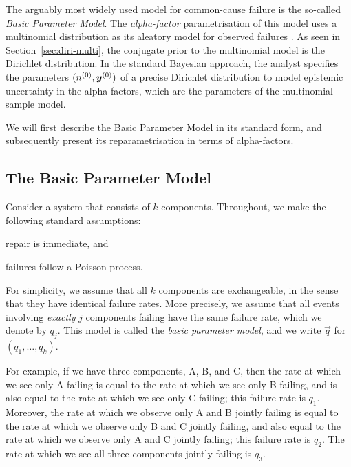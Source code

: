 The arguably most widely used model for common-cause failure is the so-called \emph{Basic Parameter Model}.
The \emph{alpha-factor} parametrisation of this model uses a multinomial distribution
as its aleatory model for observed failures \parencite{1988:mosleh::common:cause}. 
As seen in Section~\ref{sec:diri-multi}, the conjugate prior to the multinomial model is the Dirichlet distribution.
In the standard Bayesian approach, the analyst specifies the parameters $(n^{(0)}, {\bm y}^{(0)})$ of a precise Dirichlet distribution
to model epistemic uncertainty in the alpha-factors, which are the parameters of the multinomial sample model.

We will first describe the Basic Parameter Model in its standard form,
and subsequently present its reparametrisation in terms of alpha-factors.


\subsection{The Basic Parameter Model}
\label{sec:basic-param-model}

Consider a system that consists of $k$ components.
Throughout, we make the following standard assumptions:
\begin{inparaenum}[(i)]
\item repair is immediate, and
\item failures follow a Poisson process.
\end{inparaenum}

For simplicity, we assume that all $k$ components are exchangeable,
in the sense that they have identical failure rates.
More precisely,
we assume that all events involving \emph{exactly} $j$ components failing
have the same failure rate, which we denote by $q_j$.
This model is called the \emph{basic parameter model},
and we write $\vec{q}$ for $(q_1,\dots,q_k)$.

For example, if we have three components, A, B, and C,
then the rate at which we see only A failing
is equal to the rate at which we see only B failing,
and is also equal to the rate at which we see only C failing;
this failure rate is $q_1$.
Moreover, the rate at which we observe only A and B jointly failing
is equal to the rate at which we observe only B and C jointly failing,
and also equal to the rate at which we observe only A and C jointly failing;
this failure rate is $q_2$.
The rate at which we see all three components jointly failing is $q_3$.

